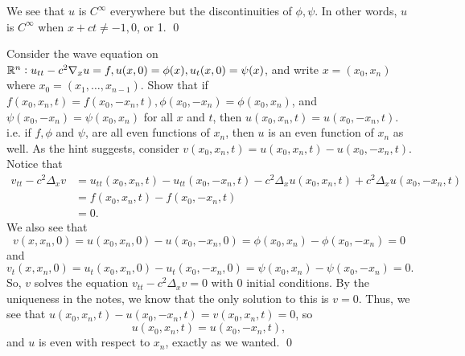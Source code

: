 \documentclass{article}
\newcommand{\D}{\nabla}
\begin{document}
We see that $u$ is $C^\infty$ everywhere but the discontinuities of $\phi, \psi$. In other words, $u$ is $C^\infty$ when $x+ct \ne -1, 0$, or 1. \qed


\newpage
{} Consider the wave equation on $\RR^n: u_{tt} - c^2\D_xu = f, u(x,0) = \phi(x),u_t(x,0) = \psi(x)$, and
write $x = (x_0,x_n)$ where $x_0 = (x_1,\dots,x_{n-1})$. Show that if $f(x_0,x_n,t) = f(x_0,- x_n,t), \phi(x_0,- x_n) =
\phi(x_0,x_n)$, and $\psi(x_0,-x_n) = \psi(x_0,x_n)$ for all $x$ and $t$, then $u(x_0, x_n, t) = u(x_0, -x_n, t)$.
\hop
i.e. if $f, \phi$ and $\psi$, are all even functions of $x_n$,
then $u$ is an even function of $x_n$ as well. \tri
\hop
\solution
As the hint suggests, consider $v(x_0, x_n, t) = u(x_0, x_n, t) - u(x_0, -x_n, t)$. Notice that 
\begin{align*}
    v_{tt} - c^2\Delta_xv &= u_{tt}(x_0, x_n, t) - u_{tt}(x_0, -x_n, t) - c^2\Delta_{x}u(x_0, x_n, t) + c^2\Delta_{x}u(x_0, -x_n, t)\\
    & = f(x_0, x_n, t) - f(x_0, -x_n, t)\\
    &= 0.
\end{align*}
We also see that 
\[v(x, x_n, 0) = u(x_0, x_n,0) - u(x_0, -x_n, 0) = \phi(x_0, x_n) - \phi(x_0, -x_n)=0\]
and 
\[v_t(x, x_n, 0) =u_t(x_0, x_n,0) - u_t(x_0, -x_n, 0) = \psi(x_0, x_n) - \psi(x_0, -x_n)=0. \]
So, $v$ solves the equation $v_{tt} - c^2\Delta_xv = 0$ with 0 initial conditions. By the uniqueness in the notes, we know that the only solution to this is $v=0$. Thus, we see that $u(x_0, x_n, t) - u(x_0, -x_n, t) = v(x_0, x_n, t) = 0$, so 
\[u(x_0, x_n, t) = u(x_0, -x_n, t),\]
and $u$ is even with respect to $x_n$, exactly as we wanted. 
\qed
\end{document}
